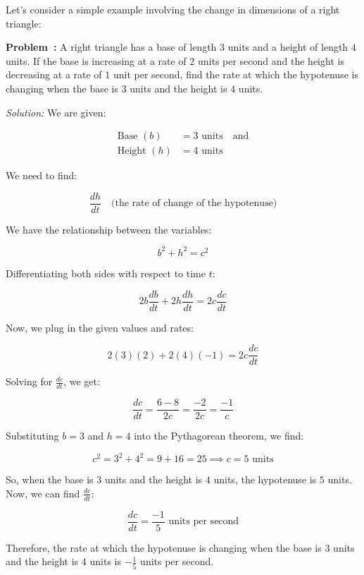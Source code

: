 \documentclass[a4paper,12pt]{book}
\newcounter{problem}
\newenvironment{problem}[1][\theproblem]
{\refstepcounter{problem}\par\medskip\noindent\textbf{Problem~#1:} \rmfamily}{\medskip}
\newenvironment{solution}[1][]
{\par\noindent\textit{Solution:} \rmfamily}{\medskip}
\newcounter{example}
\begin{document}
Let's consider a simple example involving the change in dimensions of a right triangle:

\begin{problem}
A right triangle has a base of length \(3\) units and a height of length \(4\) units. If the base is increasing at a rate of \(2\) units per second and the height is decreasing at a rate of \(1\) unit per second, find the rate at which the hypotenuse is changing when the base is \(3\) units and the height is \(4\) units.
\end{problem}

\begin{solution}
We are given:

\begin{align*}
\text{Base } (b) &= 3 \text{ units} \quad \text{and} \\
\text{Height } (h) &= 4 \text{ units}
\end{align*}

We need to find:

\[
\frac{dh}{dt} \quad \text{(the rate of change of the hypotenuse)}
\]

We have the relationship between the variables:

\[
b^2 + h^2 = c^2
\]

Differentiating both sides with respect to time \(t\):

\[
2b\frac{db}{dt} + 2h\frac{dh}{dt} = 2c\frac{dc}{dt}
\]

Now, we plug in the given values and rates:

\[
2(3)(2) + 2(4)(-1) = 2c\frac{dc}{dt}
\]

Solving for \(\frac{dc}{dt}\), we get:

\[
\frac{dc}{dt} = \frac{6 - 8}{2c} = \frac{-2}{2c} = \frac{-1}{c}
\]

Substituting \(b = 3\) and \(h = 4\) into the Pythagorean theorem, we find:

\[
c^2 = 3^2 + 4^2 = 9 + 16 = 25 \implies c = 5 \text{ units}
\]

So, when the base is \(3\) units and the height is \(4\) units, the hypotenuse is \(5\) units. Now, we can find \(\frac{dc}{dt}\):

\[
\frac{dc}{dt} = \frac{-1}{5} \text{ units per second}
\]

Therefore, the rate at which the hypotenuse is changing when the base is \(3\) units and the height is \(4\) units is \(-\frac{1}{5}\) units per second.
\end{solution}
\end{document}
